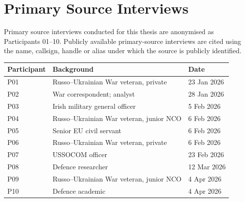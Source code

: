 \pagebreak

\pagebreak
\small
\renewcommand{\arraystretch}{1.1}
\setlength{\tabcolsep}{4pt}

\pagebreak
\section*{Primary Source Interviews}

Primary source interviews conducted for this thesis are anonymised as Participants 01--10. Publicly available primary-source interviews are cited using the name, callsign, handle or alias under which the source is publicly identified.

\begin{tabularx}{\textwidth}{@{} l l X @{}}
	\toprule
	\textbf{Participant} & \textbf{Background} & \textbf{Date} \\
	\midrule
	P01 & Russo--Ukrainian War veteran, private & 23 Jan 2026 \\
	P02 & War correspondent; analyst & 28 Jan 2026 \\
	P03 & Irish military general officer & 5 Feb 2026 \\
	P04 & Russo--Ukrainian War veteran, junior NCO & 6 Feb 2026 \\
	P05 & Senior EU civil servant & 6 Feb 2026 \\
	P06 & Russo--Ukrainian War veteran, private & 6 Feb 2026 \\
	P07 & USSOCOM officer & 23 Feb 2026 \\
	P08 & Defence researcher & 12 Mar 2026 \\
	P09 & Russo--Ukrainian War veteran, junior NCO & 4 Apr 2026 \\ 
	P10 & Defence academic & 4 Apr 2026  \\
	\bottomrule
\end{tabularx}
